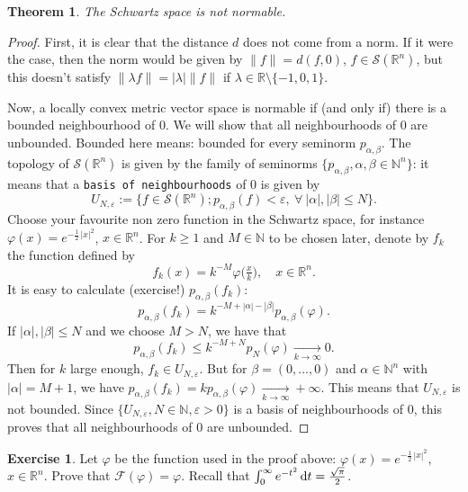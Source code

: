 \documentclass[a4paper, 12pt]{article}
\theoremstyle{plain}
\newtheorem{theorem}[proposition]{Theorem}
\theoremstyle{definition}
\newtheorem{exercise}{Exercise}
\theoremstyle{remark}
\numberwithin{equation}{section}
\begin{document}
\begin{theorem}
The Schwartz space is not normable.
\end{theorem}

\begin{proof}
First, it is clear that the distance $d$ does not come from a norm. If it were the case, then the norm would be given by $\|f\|=d(f,0)$, 
$f\in {\mathscr{S}}({\mathds{R}}^n)$, but this doesn't satisfy $\|\lambda f\|=|\lambda|\|f\|$ if $\lambda \in{\mathds{R}}\setminus\{-1,0,1\}$.

\noindent
Now, a locally convex metric vector space is normable if (and only if) there is a bounded neighbourhood of 0. We will show that 
all neighbourhoods of 0 are unbounded. Bounded here means: bounded for every seminorm $p_{\alpha,\beta}$. The topology of
${\mathscr{S}}({\mathds{R}}^n)$ is given by the family of seminorms $\{p_{\alpha,\beta}, \alpha,\beta\in{\mathds{N}}^n\}$: it means that
a {\tt basis of neighbourhoods} of 0 is given by 
\[
U_{N,\varepsilon}:=\bigl\{f\in {\mathscr{S}}({\mathds{R}}^n); p_{\alpha,\beta}(f)<\varepsilon,\ \forall\ |\alpha|,|\beta|\le N\bigr\}.
\]
Choose your favourite non zero function in the Schwartz space, for instance $\varphi(x)=e^{-\tfrac{1}{2}\,|x|^2}$,
$x\in{\mathds{R}}^n$. For $k\ge 1$ and $M\in{\mathds{N}}$
to be chosen later, denote by $f_k$ the function defined by 
\[
f_k(x)=k^{-M}\varphi\bigl(\tfrac{x}{k}\bigr), \quad x\in{\mathds{R}}^n.
\]
It is easy to calculate (exercise!) $p_{\alpha,\beta}(f_k)$:
\[
p_{\alpha,\beta}(f_k)=k^{-M+|\alpha|-|\beta|}p_{\alpha,\beta}(\varphi).
\]
If $|\alpha|,|\beta|\le N$ and we choose $M>N$, we have that 
\[
p_{\alpha,\beta}(f_k)\le k^{-M+N}p_N(\varphi)\xrightarrow[k\to\infty]{}0.
\]
Then for $k$ large enough, $f_k\in U_{N,\varepsilon}$. But for $\beta=(0,...,0)$ and $\alpha\in{\mathds{N}}^n$
with $|\alpha|=M+1$, we have $p_{\alpha,\beta}(f_k)=k p_{\alpha,\beta}(\varphi) \xrightarrow[k\to\infty]{}+\infty$. This means that 
$U_{N,\varepsilon}$ is not bounded. Since $\{U_{N,\varepsilon}, N\in{\mathds{N}}, \varepsilon >0\}$ is a basis of neighbourhoods of 0,
this proves that all neighbourhoods of 0 are unbounded.
\end{proof}

\begin{exercise}
\label{ex:gaussian}
Let $\varphi$ be the function used in the proof above: $\varphi(x)=e^{-\tfrac{1}{2}\,|x|^2}$, $x\in {\mathds{R}}^n$. Prove that
${\mathscr{F}}(\varphi)=\varphi$. Recall that $\int_0^\infty e^{-t^2}\,{\rm d}t =\frac{\sqrt{\pi}}{2}$.
\end{exercise}
\end{document}
